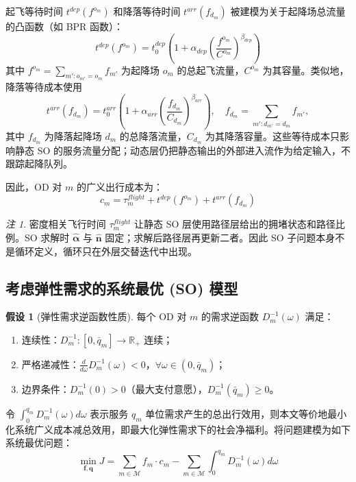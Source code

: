 \documentclass[a4paper,12pt]{article}
\theoremstyle{plain}
\theoremstyle{definition}
\newtheorem{assumption}[theorem]{假设}
\theoremstyle{remark}
\newtheorem{remark}[theorem]{注}
\begin{document}
起飞等待时间 $t^{dep}(f^{o_m})$ 和降落等待时间 $t^{arr}(f_{d_m})$ 被建模为关于起降场总流量的凸函数（如 BPR 函数）：
\begin{equation}
    t^{dep}(f^{o_m}) = t_0^{dep}\left(1 + \alpha_{dep}\left(\frac{f^{o_m}}{C^{o_m}}\right)^{\beta_{dep}}\right)
\end{equation}
其中 $f^{o_m} = \sum_{m': o_{m'} = o_m} f_{m'}$ 为起降场 $o_m$ 的总起飞流量，$C^{o_m}$ 为其容量。类似地，降落等待成本使用
\begin{equation}
    t^{arr}(f_{d_m}) = t_0^{arr}\left(1 + \alpha_{arr}\left(\frac{f_{d_m}}{C_{d_m}}\right)^{\beta_{arr}}\right),
    \quad
    f_{d_m}=\sum_{m': d_{m'}=d_m} f_{m'},
\end{equation}
其中 $f_{d_m}$ 为降落起降场 $d_m$ 的总降落流量，$C_{d_m}$ 为其降落容量。这些等待成本只影响静态 SO 的服务流量分配；动态层仍把静态输出的外部进入流作为给定输入，不跟踪起降队列。

因此，OD 对 $m$ 的广义出行成本为：
\begin{equation}\label{eq:generalized_cost}
    c_m = \tau_m^{flight} + t^{dep}(f^{o_m}) + t^{arr}(f_{d_m})
\end{equation}

\begin{remark}
密度相关飞行时间 $\tau_m^{flight}$ 让静态 SO 层使用路径层给出的拥堵状态和路径比例。SO 求解时 $\widehat{\bm\alpha}$ 与 $\hat{\bm n}$ 固定；求解后路径层再更新二者。因此 SO 子问题本身不是循环定义，循环只在外层交替迭代中出现。
\end{remark}

\subsection{考虑弹性需求的系统最优 (SO) 模型}

\begin{assumption}[弹性需求逆函数性质]\label{asm:demand_inverse}
每个 OD 对 $m$ 的需求逆函数 $D_m^{-1}(\omega)$ 满足：
\begin{enumerate}
    \item 连续性：$D_m^{-1}: [0, \bar{q}_m] \to \mathbb{R}_+$ 连续；
    \item 严格递减性：$\frac{d}{d\omega}D_m^{-1}(\omega) < 0$，$\forall \omega \in (0, \bar{q}_m)$；
    \item 边界条件：$D_m^{-1}(0) > 0$（最大支付意愿），$D_m^{-1}(\bar{q}_m) \ge 0$。
\end{enumerate}
\end{assumption}

令 $\int_0^{q_m}D_m^{-1}(\omega)d\omega$ 表示服务 $q_m$ 单位需求产生的总出行效用，则本文等价地最小化系统广义成本减总效用，即最大化弹性需求下的社会净福利。将问题建模为如下系统最优问题：
\begin{equation} \label{eq:static_so_obj}
    \min_{\bm{f}, \bm{q}} J = \sum_{m \in \mathcal{M}} f_m \cdot c_m - \sum_{m \in \mathcal{M}} \int_{0}^{q_m} D_m^{-1}(\omega) d\omega
\end{equation}
\end{document}
